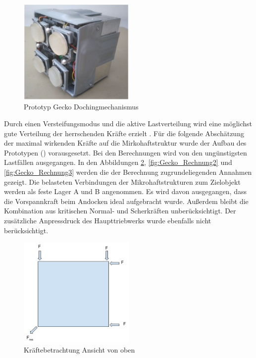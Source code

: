 \begin{figure}[!h]
	\centering
		\includegraphics[width=0.50\textwidth]{graphics/Gecko3.PNG}
	\caption{Prototyp Gecko Dochingmechanismus \cite[Figure 18, Seite 10]{Trentlage.}}
	\label{fig:Gecko3}
\end{figure}


	Durch einen Versteifungsmodus und die aktive Lastverteilung wird eine möglichst gute Verteilung der herrschenden Kräfte erzielt \cite{ChristopherTrentlage.2018}.
Für die folgende Abschätzung der maximal wirkenden Kräfte auf die Mirkohaftstruktur wurde der Aufbau des Prototypen () vorausgesetzt. Bei den Berechnungen wird von den ungünstigsten Lastfällen ausgegangen.
In den Abbildungen \ref{fig:Gecko_Rechnung1}, \ref{fig:Gecko_Rechnung2} und \ref{fig:Gecko_Rechnung3} werden die der Berechnung zugrundeliegenden Annahmen gezeigt. Die belasteten Verbindungen der Mikrohaftstrukturen zum Zielobjekt werden als feste Lager A und B angenommen. Es wird davon ausgegangen, dass die Vorspannkraft beim Andocken ideal aufgebracht wurde. Außerdem bleibt die Kombination aus kritischen Normal- und Scherkräften unberücksichtigt. Der zusätzliche Anpressdruck des Haupttriebwerks wurde ebenfalls nicht berücksichtigt.

\begin{figure}[!h]
	\centering
		\includegraphics[width=0.50\textwidth]{graphics/Gecko_Rechnung1.png}
	\caption{Kräftebetrachtung Ansicht von oben}
	\label{fig:Gecko_Rechnung1}
\end{figure}

